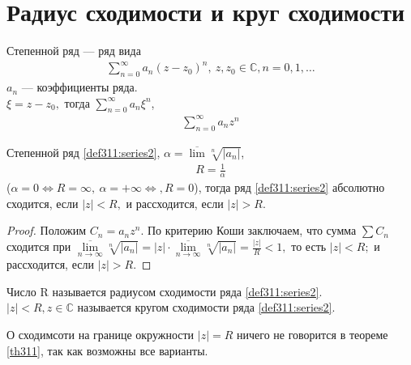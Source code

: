 \section{Радиус сходимости и круг сходимости}
\begin{definition}
  Степенной ряд --- ряд вида
  \begin{gather}
    \sum\limits_{n = 0}^{\infty} a_n(z - z_0)^n, \ z, z_0 \in \mathbb{C}, n = 0, 1, \dots
    \label{def311:series1}
  \end{gather}
  $a_n$ --- коэффициенты ряда. \\
  $\xi = z - z_0, $ тогда
  $\sum\limits_{n = 0}^{\infty} a_n \xi^n$,
  \begin{gather}
    \sum\limits_{n = 0}^{\infty} a_n z^n \label{def311:series2}
  \end{gather}
\end{definition}

\begin{theorem}
  \label{th311}
  Степенной ряд \eqref{def311:series2}, $\alpha = \overline{\lim} \sqrt[n]{|a_n|}$,
  \begin{gather}
    R = \frac{1}{\alpha} \label{def311:eq1}
  \end{gather}
  ($\alpha = 0 \Longleftrightarrow R = \infty, \
  \alpha = +\infty \Longleftrightarrow, R = 0$), тогда ряд \eqref{def311:series2}
  абсолютно сходится, если $|z| < R,$ и рассходится, если $|z| > R$.
\end{theorem}

\begin{proof}
  Положим $C_n = a_n z^n$. По критерию Коши заключаем, что сумма
  $\sum C_n$ сходится при $\overline{\lim\limits_{n \to \infty}} \sqrt[n]{|a_n|}
  = |z|\cdot \overline{\lim\limits_{n \to \infty}} \sqrt[n]{|a_n|} =
  \frac{|z|}{R} < 1,$ то есть $|z| < R;$ и рассходится, если $|z| > R$.
\end{proof}

\begin{definition}
  Число R называется радиусом сходимости ряда \eqref{def311:series2}. \\
  $|z| < R, z \in \mathbb{C}$ называется кругом сходимости ряда
  \eqref{def311:series2}.
\end{definition}

\begin{remark}
  О сходимсоти на границе окружности $|z| = R$ ничего не говорится в теореме
  \eqref{th311}, так как возможны все варианты.
\end{remark}

